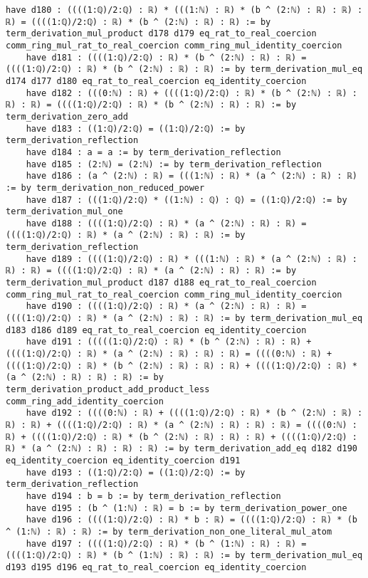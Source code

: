 \documentclass{article}
\begin{document}
\begin{tcolorbox}[colback=white!10, width=\linewidth]
\begin{lstlisting}[language=Lean4]
    have d180 : ((((1:ℚ)/2:ℚ) : ℝ) * (((1:ℕ) : ℝ) * (b ^ (2:ℕ) : ℝ) : ℝ) : ℝ) = ((((1:ℚ)/2:ℚ) : ℝ) * (b ^ (2:ℕ) : ℝ) : ℝ) := by term_derivation_mul_product d178 d179 eq_rat_to_real_coercion comm_ring_mul_rat_to_real_coercion comm_ring_mul_identity_coercion
    have d181 : ((((1:ℚ)/2:ℚ) : ℝ) * (b ^ (2:ℕ) : ℝ) : ℝ) = ((((1:ℚ)/2:ℚ) : ℝ) * (b ^ (2:ℕ) : ℝ) : ℝ) := by term_derivation_mul_eq d174 d177 d180 eq_rat_to_real_coercion eq_identity_coercion
    have d182 : (((0:ℕ) : ℝ) + ((((1:ℚ)/2:ℚ) : ℝ) * (b ^ (2:ℕ) : ℝ) : ℝ) : ℝ) = ((((1:ℚ)/2:ℚ) : ℝ) * (b ^ (2:ℕ) : ℝ) : ℝ) := by term_derivation_zero_add
    have d183 : ((1:ℚ)/2:ℚ) = ((1:ℚ)/2:ℚ) := by term_derivation_reflection
    have d184 : a = a := by term_derivation_reflection
    have d185 : (2:ℕ) = (2:ℕ) := by term_derivation_reflection
    have d186 : (a ^ (2:ℕ) : ℝ) = (((1:ℕ) : ℝ) * (a ^ (2:ℕ) : ℝ) : ℝ) := by term_derivation_non_reduced_power
    have d187 : (((1:ℚ)/2:ℚ) * ((1:ℕ) : ℚ) : ℚ) = ((1:ℚ)/2:ℚ) := by term_derivation_mul_one
    have d188 : ((((1:ℚ)/2:ℚ) : ℝ) * (a ^ (2:ℕ) : ℝ) : ℝ) = ((((1:ℚ)/2:ℚ) : ℝ) * (a ^ (2:ℕ) : ℝ) : ℝ) := by term_derivation_reflection
    have d189 : ((((1:ℚ)/2:ℚ) : ℝ) * (((1:ℕ) : ℝ) * (a ^ (2:ℕ) : ℝ) : ℝ) : ℝ) = ((((1:ℚ)/2:ℚ) : ℝ) * (a ^ (2:ℕ) : ℝ) : ℝ) := by term_derivation_mul_product d187 d188 eq_rat_to_real_coercion comm_ring_mul_rat_to_real_coercion comm_ring_mul_identity_coercion
    have d190 : ((((1:ℚ)/2:ℚ) : ℝ) * (a ^ (2:ℕ) : ℝ) : ℝ) = ((((1:ℚ)/2:ℚ) : ℝ) * (a ^ (2:ℕ) : ℝ) : ℝ) := by term_derivation_mul_eq d183 d186 d189 eq_rat_to_real_coercion eq_identity_coercion
    have d191 : (((((1:ℚ)/2:ℚ) : ℝ) * (b ^ (2:ℕ) : ℝ) : ℝ) + ((((1:ℚ)/2:ℚ) : ℝ) * (a ^ (2:ℕ) : ℝ) : ℝ) : ℝ) = ((((0:ℕ) : ℝ) + ((((1:ℚ)/2:ℚ) : ℝ) * (b ^ (2:ℕ) : ℝ) : ℝ) : ℝ) + ((((1:ℚ)/2:ℚ) : ℝ) * (a ^ (2:ℕ) : ℝ) : ℝ) : ℝ) := by term_derivation_product_add_product_less comm_ring_add_identity_coercion
    have d192 : ((((0:ℕ) : ℝ) + ((((1:ℚ)/2:ℚ) : ℝ) * (b ^ (2:ℕ) : ℝ) : ℝ) : ℝ) + ((((1:ℚ)/2:ℚ) : ℝ) * (a ^ (2:ℕ) : ℝ) : ℝ) : ℝ) = ((((0:ℕ) : ℝ) + ((((1:ℚ)/2:ℚ) : ℝ) * (b ^ (2:ℕ) : ℝ) : ℝ) : ℝ) + ((((1:ℚ)/2:ℚ) : ℝ) * (a ^ (2:ℕ) : ℝ) : ℝ) : ℝ) := by term_derivation_add_eq d182 d190 eq_identity_coercion eq_identity_coercion d191
    have d193 : ((1:ℚ)/2:ℚ) = ((1:ℚ)/2:ℚ) := by term_derivation_reflection
    have d194 : b = b := by term_derivation_reflection
    have d195 : (b ^ (1:ℕ) : ℝ) = b := by term_derivation_power_one
    have d196 : ((((1:ℚ)/2:ℚ) : ℝ) * b : ℝ) = ((((1:ℚ)/2:ℚ) : ℝ) * (b ^ (1:ℕ) : ℝ) : ℝ) := by term_derivation_non_one_literal_mul_atom
    have d197 : ((((1:ℚ)/2:ℚ) : ℝ) * (b ^ (1:ℕ) : ℝ) : ℝ) = ((((1:ℚ)/2:ℚ) : ℝ) * (b ^ (1:ℕ) : ℝ) : ℝ) := by term_derivation_mul_eq d193 d195 d196 eq_rat_to_real_coercion eq_identity_coercion

\end{lstlisting}
\end{tcolorbox}
\end{document}
